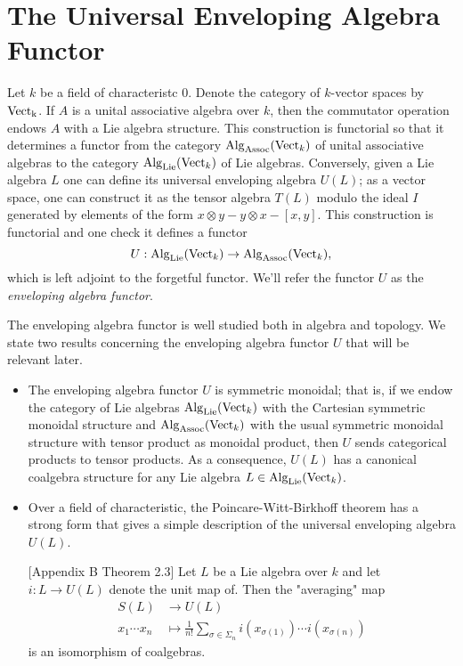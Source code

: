 \section{The Universal Enveloping Algebra Functor}
Let $k$ be a field of characteristc $0$. Denote the category of $k$-vector spaces by $\operatorname{Vect_k}$.
If $A$ is a unital associative algebra over $k$, then the commutator operation endows $A$ with a Lie algebra structure. This construction is functorial so that it determines a functor from the category $\operatorname{Alg}_{\operatorname{Assoc}}(\operatorname{Vect}_k)$ of unital associative algebras to the category $\operatorname{Alg}_{\operatorname{Lie}}(\operatorname{Vect}_k)$ of Lie algebras. 
Conversely, given a Lie algebra $L$ one can define its universal enveloping algebra $U(L)$; as a vector space, one can construct it as the tensor algebra $T(L)$ modulo the ideal $I$ generated by 
 elements of the form $x\otimes y - y\otimes x-[x,y]$. 
This construction is functorial and one check it defines a functor
$$
U:\operatorname{Alg}_{\operatorname{Lie}}(\operatorname{Vect}_k) \rightarrow \operatorname{Alg}_{\operatorname{Assoc}}(\operatorname{Vect}_k),
$$
which is left adjoint to the forgetful functor.
We'll refer the functor $U$ as the \emph{enveloping algebra functor}. 

The enveloping algebra functor is well studied both in algebra and topology. We state two results concerning the enveloping algebra functor $U$ that will be relevant later.
\begin{itemize}
	\item The enveloping algebra functor $U$ is symmetric monoidal; that is, if we endow the category of Lie algebras $\operatorname{Alg}_{\operatorname{Lie}}(\operatorname{Vect}_k)$ with the Cartesian symmetric monoidal structure and $\operatorname{Alg}_{\operatorname{Assoc}}(\operatorname{Vect}_k)$ with the usual symmetric monoidal structure with tensor product as monoidal product, then $U$ sends categorical products to tensor products. As a consequence, $U(L)$ has a canonical coalgebra structure for any Lie algebra $L\in \operatorname{Alg}_{\operatorname{Lie}}(\operatorname{Vect}_k)$.
	\item Over a field of characteristic, the Poincare-Witt-Birkhoff theorem has a strong form that gives a simple description of the universal enveloping algebra $U(L)$. 
	\begin{theorem}
		\cite{Quillen_RHT}[Appendix B Theorem 2.3]
		Let $L$ be a Lie algebra over $k$ and let $i:L\to U(L)$ denote the unit map of. Then the "averaging" map
		\begin{align*}
			S(L) & \to U(L) \\
			x_1\cdots x_n & \mapsto \frac{1}{n!}\sum_{\sigma\in \Sigma_n} i(x_{\sigma(1)})\cdots i(x_{\sigma(n)})
		\end{align*}	
		is an isomorphism of coalgebras.
	\end{theorem}
	
\end{itemize}

